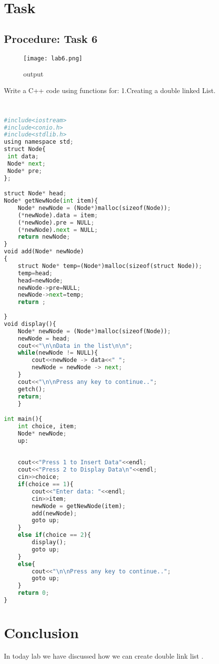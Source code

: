 \documentclass[11pt]{article}            %
\begin{document}
\section{Task}  
\subsection{Procedure: Task 6 }     

\begin{figure*}
\centering
  \texttt{[image: lab6.png]}
\caption{output}
\label{Figure:Untitled}    
\end{figure*}
Write a C++ code using functions for:
1.Creating a double linked List.

\subsection{ }     

\begin{lstlisting}[language=Python]
 
#include<iostream>
#include<conio.h>
#include<stdlib.h>
using namespace std;
struct Node{
 int data;
 Node* next;
 Node* pre;
};

struct Node* head;
Node* getNewNode(int item){
	Node* newNode = (Node*)malloc(sizeof(Node));
	(*newNode).data = item;
	(*newNode).pre = NULL;
	(*newNode).next = NULL;
	return newNode;
}
void add(Node* newNode)
{
	struct Node* temp=(Node*)malloc(sizeof(struct Node));
	temp=head;
	head=newNode;
	newNode->pre=NULL;
	newNode->next=temp;
	return ;
	
}
void display(){
	Node* newNode = (Node*)malloc(sizeof(Node));
	newNode = head;
	cout<<"\n\nData in the list\n\n";
	while(newNode != NULL){
		cout<<newNode -> data<<" ";
		newNode = newNode -> next;
	}
	cout<<"\n\nPress any key to continue..";
	getch();
	return;
	}

int main(){
	int choice, item;
	Node* newNode;
	up:
		
	
	cout<<"Press 1 to Insert Data"<<endl;
	cout<<"Press 2 to Display Data\n"<<endl;
	cin>>choice;
	if(choice == 1){
		cout<<"Enter data: "<<endl;
		cin>>item;
		newNode = getNewNode(item);
		add(newNode);
		goto up;
	}
	else if(choice == 2){
		display();
		goto up;
	}
	else{
		cout<<"\n\nPress any key to continue..";
		goto up;
	}
	return 0;
}

\end{lstlisting}

\section{Conclusion}  
In today lab we have discussed how we can create double link list .

 
\end{document}
